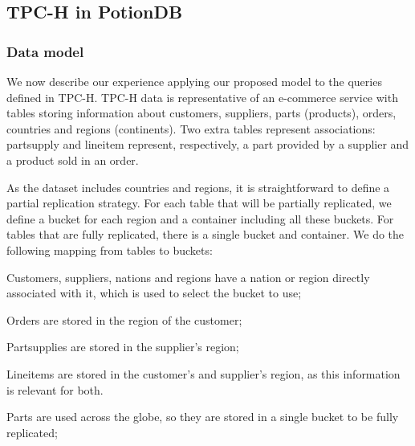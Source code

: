 \documentclass[sigplan,review,anonymous]{acmart}
\begin{document}


\subsection{TPC-H in PotionDB}


\subsubsection{Data model}
\label{subsec:dataset}

We now describe our experience applying our proposed model to the queries defined in TPC-H.
TPC-H data is representative of an e-commerce service with tables storing information about customers, suppliers, parts (products), orders, 
countries and regions (continents).
Two extra tables represent associations: partsupply and lineitem represent, respectively, a part provided by a supplier
and a product sold in an order. 

As the dataset includes countries and regions, it is straightforward to define a partial replication strategy. 
For each table that will be partially replicated, we define a bucket for each region and a container including all these buckets.
For tables that are fully replicated, there is a single bucket and container. 
We do the following mapping from tables to buckets: 
\begin{inparaenum}[(i)]
\item Customers, suppliers, nations and regions have a nation or region directly
associated with it, which is used to select the bucket to use;
\item Orders are stored in the region of the customer;
\item Partsupplies are stored in the supplier's region;
\item Lineitems are stored in the customer's and supplier's region, as this information is relevant for both.
\item Parts are used across the globe, so they are stored in a single bucket to be fully replicated;
\end{inparaenum}
\end{document}
